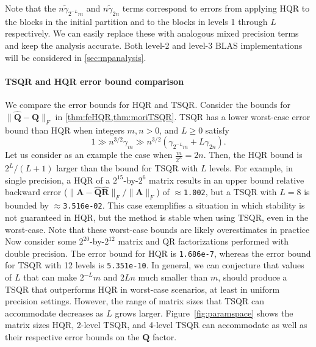 \documentclass[review,onefignum,onetabnum]{siamart190516}
\newcommand{\bb}[1]{\mathbf{#1}}
\begin{document}
Note that the $n\tilde{\gamma}_{2^{-L}m}$ and $n\tilde{\gamma}_{ 2n}$ terms correspond to errors from applying HQR to the blocks in the initial partition and to the blocks in levels 1 through $L$ respectively.
We can easily replace these with analogous mixed precision terms and keep the analysis accurate.
Both level-2 and level-3 BLAS implementations will be considered in \cref{sec:mpanalysis}.
\paragraph{TSQR and HQR error bound comparison}
We compare the error bounds for HQR and TSQR. 
Consider the bounds for $\|\hat{\bb{Q}}-\bb{Q}\|_F$ in \cref{thm:feHQR,thm:moriTSQR}.
TSQR has a lower worst-case error bound than HQR when integers $m, n > 0$, and $L\geq0$ satisfy
\begin{equation*}
1\gg n^{3/2}\gamma_m \gg n^{3/2}(\gamma_{2^{-L}m}+L\gamma_{2n}).
\end{equation*}
Let us consider as an example the case when $\frac{m}{2^L}=2n$.
Then, the HQR bound is $2^L/(L+1)$ larger than the bound for TSQR with $L$ levels.
For example, in single precision, a HQR of a $2^{15}$-by-$2^6$ matrix results in an upper bound relative backward error ($\|\bb{A}-\hat{\bb{Q}}\hat{\bb{R}}\|_F/\|\bb{A}\|_F$) of $\approx${\tt1.002}, but a TSQR with $L=8$ is bounded by $\approx${\tt 3.516e-02}. 
This case exemplifies a situation in which stability is not guaranteed in HQR, but the method is stable when using TSQR, even in the worst-case. 
Note that these worst-case bounds are likely overestimates in practice
Now consider some $2^{20}$-by-$2^{12}$ matrix and QR factorizations performed with double precision.
The error bound for HQR is {\tt 1.686e-7}, whereas the error bound for TSQR with 12 levels is {\tt 5.351e-10}.
In general, we can conjecture that values of $L$ that can make $2^{-L}m$ and $2Ln$ much smaller than $m$, should produce a TSQR that outperforms HQR in worst-case scenarios, at least in uniform precision settings.
However, the range of matrix sizes that TSQR can accommodate decreases as $L$ grows larger.
Figure~\ref{fig:paramspace} shows the matrix sizes HQR, 2-level TSQR, and 4-level TSQR can accommodate as well as their respective error bounds on the $\bb{Q}$ factor.\par
\end{document}

